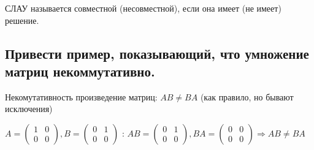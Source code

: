 СЛАУ называется совместной (несовместной), если она имеет (не имеет) решение.

\subsection{Привести пример, показывающий, что умножение матриц некоммутативно.}

Некомутативность произведение матриц: $AB\ne BA$ (как правило, но бывают исключения)

$A = \begin{pmatrix}1&0\\0&0\end{pmatrix}, 
           B = \begin{pmatrix}0&1\\0&0\end{pmatrix}$ :  $
           AB = \begin{pmatrix}0&1\\0&0\end{pmatrix},
           BA = \begin{pmatrix}0&0\\0&0\end{pmatrix}
           \Rightarrow AB \ne BA$